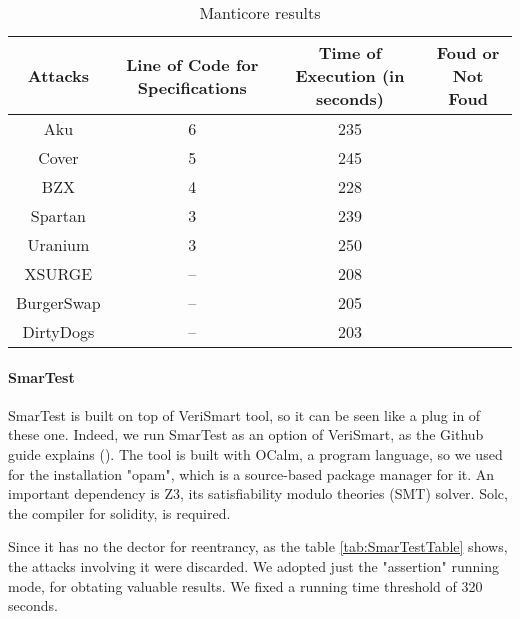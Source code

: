 \begin{center}
\begin{table*}
    \caption{Manticore results}
        \label{tab:ManticoreTable}
        \begin{tabular}{cccc}
        \toprule
            Attacks & Line of Code for Specifications & Time of Execution (in seconds) & Foud or Not Foud \\
            \midrule
            Aku & 6 & 235  &  \\ 
            Cover & 5 & 245 & \\ 
            BZX  & 4 & 228 & \\ 
            Spartan & 3 & 239 & \\ 
            Uranium  & 3 & 250& \\ 
            XSURGE & -- & 208 & \\ 
            BurgerSwap  &  -- & 205 &\\ 
            DirtyDogs & -- & 203 &  \\
        \bottomrule
    \end{tabular}
\end{table*}
\end{center}

\paragraph{SmarTest} SmarTest is built on top of VeriSmart tool, so it can be seen like a plug in of these one. Indeed, we run SmarTest as an option of VeriSmart, 
as the Github guide explains (\cite{SmarTestGitHub}). The tool is built with OCalm, a program language, so we used for the installation "opam", which is a source-based package manager for it.
An important dependency is Z3, its satisfiability modulo theories (SMT) solver. Solc, the compiler for solidity, is required.

Since it has no the dector for reentrancy, as the table \autoref{tab:SmarTestTable} shows, the attacks involving it were discarded. We adopted just the "assertion" running mode, for obtating valuable results. 
We fixed a running time threshold of 320 seconds.

